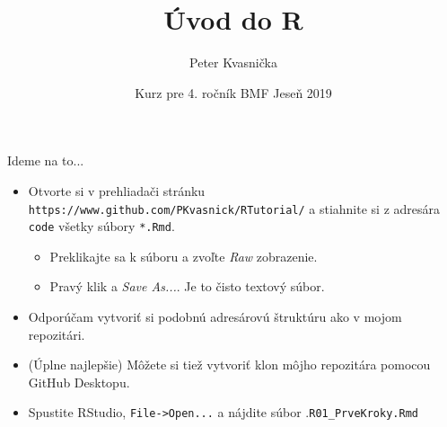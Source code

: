 \documentclass[9pt]{beamer}
\author{Peter Kvasnička}
\title{Úvod do R}
\institute{Univerzita Karlova, Praha}
\date{Kurz pre 4. ročník BMF \newline Jeseň 2019}
\begin{document}
\begin{frame}
\titlepage
\end{frame}

\clearpage  \clearpage
\clearpage  \clearpage

\begin{frame}{Ideme na to...}
	\begin{itemize}
		\item Otvorte si v prehliadači stránku \texttt{https://www.github.com/PKvasnick/RTutorial/} a stiahnite si z adresára \texttt{code} všetky súbory \texttt{*.Rmd}.
		\begin{itemize}
			\item Preklikajte sa k súboru a zvoľte \emph{Raw} zobrazenie.
			\item Pravý klik a \emph{Save As...}. Je to čisto textový súbor.
		\end{itemize}
		\item Odporúčam vytvoriť si podobnú adresárovú štruktúru ako v mojom repozitári.
		\item (Úplne najlepšie) Môžete si tiež vytvoriť klon môjho repozitára pomocou GitHub Desktopu.
		\item Spustite RStudio, \texttt{File->Open...} a nájdite súbor .\texttt{R01\_PrveKroky.Rmd}
	\end{itemize}
\end{frame}
\end{document}
